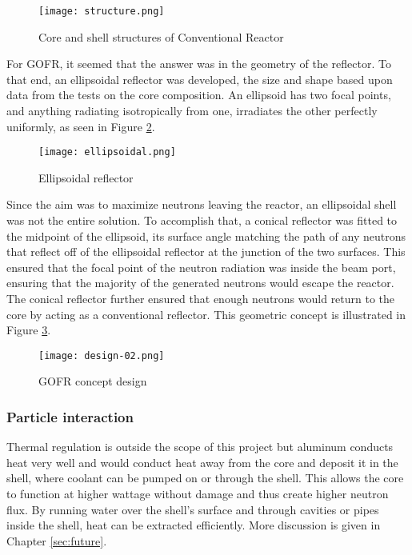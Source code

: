 \begin{figure}[!htbp]
\centering
\texttt{[image: structure.png]}
\caption{Core and shell structures of Conventional Reactor}
\label{fig:structure}
\end{figure}

For GOFR, it seemed that the answer was in the geometry of the reflector. To that end, an ellipsoidal reflector was developed, the size and shape based upon data from the tests on the core composition. An ellipsoid has two focal points, and anything radiating isotropically from one, irradiates the other perfectly uniformly, as seen in Figure \ref{fig:ellipsoid}.

\begin{figure}[!htbp]
\centering
\texttt{[image: ellipsoidal.png]}
\caption{Ellipsoidal reflector}
\label{fig:ellipsoid}
\end{figure}

Since the aim was to maximize neutrons leaving the reactor, an ellipsoidal shell was not the entire solution. To accomplish that, a conical reflector was fitted to the midpoint of the ellipsoid, its surface angle matching the path of any neutrons that reflect off of the ellipsoidal reflector at the junction of the two surfaces. This ensured that the focal point of the neutron radiation was inside the beam port, ensuring that the majority of the generated neutrons would escape the reactor. The conical reflector further ensured that enough neutrons would return to the core by acting as a conventional reflector. This geometric concept is illustrated in Figure \ref{fig:design02}.

\begin{figure}[!htbp]
\centering
\texttt{[image: design-02.png]}
\caption{GOFR concept design}
\label{fig:design02}
\end{figure}

\subsubsection{Particle interaction}

Thermal regulation is outside the scope of this project but aluminum conducts heat very well and would conduct heat away from the core and deposit it in the shell, where coolant can be pumped on or through the shell. This allows the core to function at higher wattage without damage and thus create higher neutron flux. By running water over the shell's surface and through cavities or pipes inside the shell, heat can be extracted efficiently. More discussion is given in Chapter \ref{sec:future}.

